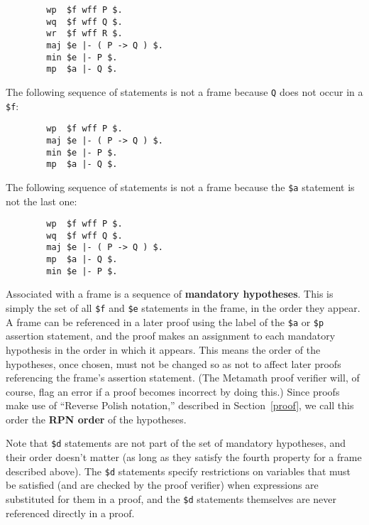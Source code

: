 \begin{verbatim}
        wp  $f wff P $.
        wq  $f wff Q $.
        wr  $f wff R $.
        maj $e |- ( P -> Q ) $.
        min $e |- P $.
        mp  $a |- Q $.
\end{verbatim}

The following sequence of statements is not a frame because \texttt{Q} does not
occur in a \texttt{\$f}:

\begin{verbatim}
        wp  $f wff P $.
        maj $e |- ( P -> Q ) $.
        min $e |- P $.
        mp  $a |- Q $.
\end{verbatim}

The following sequence of statements is not a frame because the \texttt{\$a} statement is
not the last one:

\begin{verbatim}
        wp  $f wff P $.
        wq  $f wff Q $.
        maj $e |- ( P -> Q ) $.
        mp  $a |- Q $.
        min $e |- P $.
\end{verbatim}

Associated with a frame is a sequence of {\bf mandatory
hypotheses}.  This is simply the set of all
\texttt{\$f} and \texttt{\$e} statements in the frame, in the order they
appear.  A frame can be referenced in a later proof using the label of
the \texttt{\$a} or \texttt{\$p} assertion statement, and the proof
makes an assignment to each mandatory hypothesis in the order in which
it appears.  This means the order of the hypotheses, once chosen, must
not be changed so as not to affect later proofs referencing the frame's
assertion statement.  (The Metamath proof verifier will, of course, flag
an error if a proof becomes incorrect by doing this.)  Since proofs make
use of ``Reverse Polish notation,'' described in Section~\ref{proof}, we
call this order the {\bf RPN order} of the hypotheses.

Note that \texttt{\$d} statements are not part of the set of mandatory
hypotheses, and their order doesn't matter (as long as they satisfy the
fourth property for a frame described above).  The \texttt{\$d}
statements specify restrictions on variables that must be satisfied (and
are checked by the proof verifier) when expressions are substituted for
them in a proof, and the \texttt{\$d} statements themselves are never
referenced directly in a proof.

